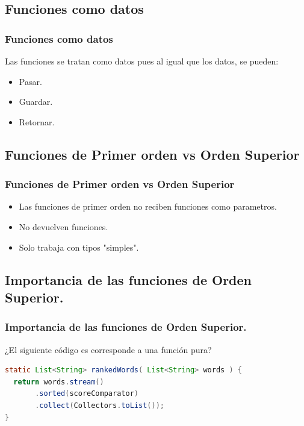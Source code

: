 \documentclass{beamer}
\begin{document}
\subsection{Funciones como datos}

\begin{frame}[fragile]
    \frametitle{Funciones como datos}
    Las funciones se tratan como datos pues al igual que los datos, se pueden:
    \begin{itemize}
        \item Pasar.
        \item Guardar.
        \item Retornar.
    \end{itemize}
\end{frame}


\subsection{Funciones de Primer orden vs Orden Superior}

\begin{frame}[fragile]
    \frametitle{Funciones de Primer orden vs Orden Superior}
    \begin{itemize}
        \item Las funciones de primer orden no reciben funciones como parametros.
        \item No devuelven funciones.
        \item Solo trabaja con tipos "simples".
    \end{itemize}
    
\end{frame}

\subsection{Importancia de las funciones de Orden Superior.}

\begin{frame}[fragile]
    \frametitle{Importancia de las funciones de Orden Superior.}
¿El siguiente código es corresponde a una función pura?
\begin{lstlisting}[language=java]
static List<String> rankedWords( List<String> words ) {
  return words.stream()
       .sorted(scoreComparator)
       .collect(Collectors.toList());
}
\end{lstlisting}

\end{frame}
\end{document}
